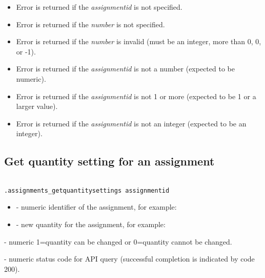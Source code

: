 \errheader
\begin{itemize}
    \item Error  is returned if the \textit{assignmentid} is not specified.
    \item Error  is returned if the \textit{number} is not specified.
    \item Error  is returned if the \textit{number} is invalid (must be an integer, more than 0, 0, or -1).
    \item Error  is returned if the \textit{assignmentid} is not a number (expected to be numeric).
    \item Error  is returned if the \textit{assignmentid} is not 1 or more (expected to be 1 or a larger value).
    \item Error  is returned if the \textit{assignmentid} is not an integer (expected to be an integer).
\end{itemize}


\subsection{Get quantity setting for an assignment}

\begin{lstlisting}[style=CommandLineStyle, showlines=true]

.assignments_getquantitysettings assignmentid

\end{lstlisting}

\paramsheader
\begin{itemize}

    \item {} - numeric identifier of the assignment, for
    example:

    \item {} - new quantity for the assignment, for example:

\end{itemize}

\savedres
\begin{compactitem}
    \item {} - numeric 1=quantity can be changed or 0=quantity cannot be changed.
    \item {}  - numeric status code for API query (successful completion is indicated by code 200).
\end{compactitem}

